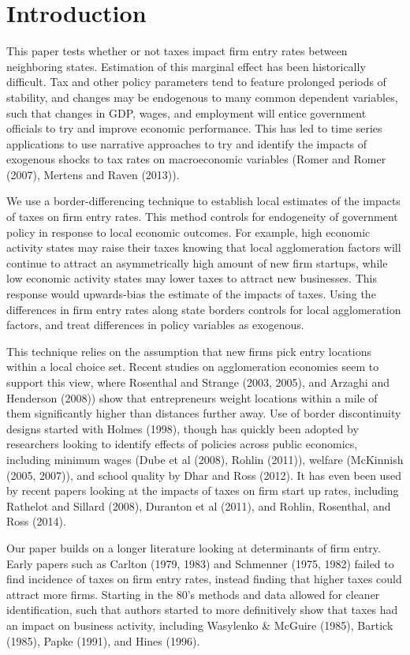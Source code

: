 
\section{Introduction} 

This paper tests whether or not taxes impact firm entry rates between neighboring states. Estimation of this marginal effect has been historically difficult. Tax and other policy parameters tend to feature prolonged periods of stability, and changes may be endogenous to many common dependent variables, such that changes in GDP, wages, and employment will entice government officials to try and improve economic performance. This has led to time series applications to use narrative approaches to try and identify the impacts of exogenous shocks to tax rates on macroeconomic variables (Romer and Romer (2007), Mertens and Raven (2013)). 

We use a border-differencing technique to establish local estimates of the impacts of taxes on firm entry rates. This method controls for endogeneity of government policy in response to local economic outcomes. For example, high economic activity states may raise their taxes knowing that local agglomeration factors will continue to attract an asymmetrically high amount of new firm startups, while low economic activity states may lower taxes to attract new businesses. This response would upwards-bias the estimate of the impacts of taxes. Using the differences in firm entry rates along state borders controls for local agglomeration factors, and treat differences in policy variables as exogenous.

This technique relies on the assumption that new firms pick entry locations within a local choice set. Recent studies on agglomeration economies seem to support this view, where Rosenthal and Strange (2003, 2005), and Arzaghi and Henderson (2008)) show that entrepreneurs weight locations within a mile of them significantly higher than distances further away. Use of border discontinuity designs started with Holmes (1998), though has quickly been adopted by researchers looking to identify effects of policies across public economics, including minimum wages (Dube et al (2008), Rohlin (2011)), welfare (McKinnish (2005, 2007)), and school quality by Dhar and Ross (2012). It has even been used by recent papers looking at the impacts of taxes on firm start up rates, including Rathelot and Sillard (2008), Duranton et al (2011), and Rohlin, Rosenthal, and Ross (2014).

Our paper builds on a longer literature looking at determinants of firm entry. Early papers such as Carlton (1979, 1983) and Schmenner (1975, 1982) failed to find incidence of taxes on firm entry rates, instead finding that higher taxes could attract more firms. Starting in the 80's methods and data  allowed for cleaner identification, such that authors started to more definitively show that taxes had an impact on business activity, including Wasylenko \& McGuire (1985), Bartick (1985), Papke (1991), and Hines (1996).


